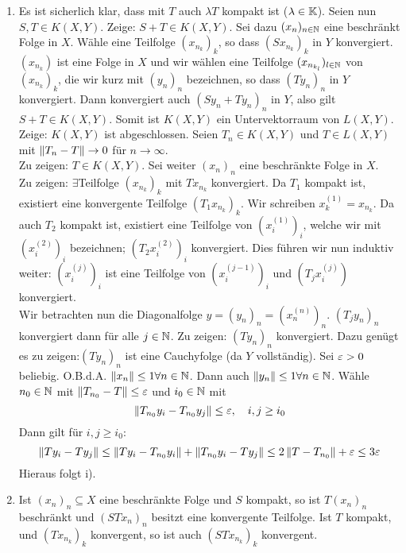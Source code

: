\begin{beweis}
	\begin{enumerate}
		\item Es ist sicherlich klar, dass mit $ T $ auch $ \lambda T $ kompakt ist ($ \lambda\in\mathbb{K} $). Seien nun $ S,T\in K(X,Y) $. Zeige: $ S+T\in K(X,Y) $. Sei dazu $ (x_n)_{n\in\mathbb{N}} $ eine beschr\"ankt Folge in $ X $. W\"ahle eine Teilfolge $ (x_{n_k})_k $, so dass $ (Sx_{n_k})_k $ in $ Y $ konvergiert. $ (x_{n_k}) $ ist eine Folge in $ X $ und wir w\"ahlen eine Teilfolge $ (x_{n_{k_l}})_{l\in\mathbb{N}} $ von $ (x_{n_k})_k $, die wir kurz mit $ (y_n)_n $ bezeichnen, so dass $ (Ty_{n})_n $ in $ Y $ konvergiert. Dann konvergiert auch $ (Sy_n+Ty_n)_n $ in $ Y $, also gilt $ S+T\in K(X,Y) $. Somit ist $ K(X,Y) $ ein Untervektorraum von $ L(X,Y) $.\\
		Zeige: $ K(X,Y) $ ist abgeschlossen. Seien $ T_n\in K(X,Y) $ und $ T\in L(X,Y) $ mit $ \left\|T_n-T\right\|\rightarrow 0 $ f\"ur $ n\rightarrow\infty $.\\
		Zu zeigen: $ T\in K(X,Y) $. Sei weiter $ (x_n)_n $ eine beschr\"ankte Folge in $ X $.\\
		Zu zeigen: $ \exists $Teilfolge $ (x_{n_k})_k $ mit $ Tx_{n_k} $ konvergiert. Da $ T_1 $ kompakt ist, existiert eine konvergente Teilfolge $ (T_1x_{n_k})_k $. Wir schreiben $ x_k^{(1)}=x_{n_k} $. Da auch $ T_2 $ kompakt ist, existiert eine Teilfolge von $ (x_i^{(1)})_i $, welche wir mit $ (x_i^{(2)})_i $ bezeichnen; $ (T_2x_i^{(2)})_i $ konvergiert. Dies f\"uhren wir nun induktiv weiter: $ (x_i^{(j)})_i $ ist eine Teilfolge von $ (x_i^{(j-1)})_i $ und $ (T_jx_i^{(j)}) $ konvergiert.\\
		Wir betrachten nun die Diagonalfolge $ y=(y_n)_n=(x_n^{(n)})_n $. $ (T_jy_n)_n $ konvergiert dann f\"ur alle $ j\in\mathbb{N} $.
		Zu zeigen: $ (Ty_n)_n $ konvergiert. Dazu gen\"ugt es zu zeigen:$ (Ty_n)_n $ ist eine Cauchyfolge (da $ Y $ vollst\"andig). Sei $ \varepsilon>0 $ beliebig. O.B.d.A. $ \left\|x_n\right\|\leq 1\forall n\in\mathbb{N} $. Dann auch $ \left\|y_n\right\|\leq 1\forall n\in\mathbb{N} $. W\"ahle $ n_0\in\mathbb{N} $ mit $ \left\|T_{n_0}-T\right\|\leq\varepsilon $ und $ i_0\in\mathbb{N} $ mit
		\[ \left\|T_{n_0}y_i-T_{n_0}y_j\right\|\leq\varepsilon,\quad i,j\geq i_0 \]
		Dann gilt f\"ur $ i,j\geq i_0 $:
		\[ \left\|Ty_i-Ty_j\right\|\leq\left\|Ty_i-T_{n_0}y_i\right\|+\left\|T_{n_0}y_i-Ty_j\right\|\leq 2\left\|T-T_{n_0}\right\|+\varepsilon\leq 3\varepsilon \]
		Hieraus folgt i).
		\item Ist $ (x_n)_n\subseteq X $ eine beschr\"ankte Folge und $ S $ kompakt, so ist $ T(x_n)_n $ beschr\"ankt und $ (STx_n)_n $ besitzt eine konvergente Teilfolge. Ist $ T $ kompakt, und $ (Tx_{n_k})_k $ konvergent, so ist auch $ (STx_{n_k})_k $ konvergent.
	\end{enumerate}
\end{beweis}
